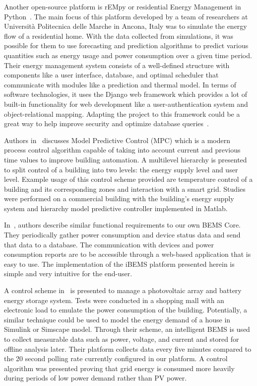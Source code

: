 \documentclass[conference]{IEEEtran}
\begin{document}
Another open-source platform is rEMpy or residential Energy Management in
Python~\cite{FAGIANI2018131}. The main focus of this platform developed by a team of researchers at
Universit\`{a} Politecnica delle Marche in Ancona, Italy was to simulate the
energy flow of a residential home. With the data collected from simulations, it
was possible for them to use forecasting and prediction algorithms to predict
various quantities such as energy usage and power consumption over a given time period. Their energy management system consists of a well-defined structure with components like a user interface, database, and optimal scheduler that communicate with modules like a prediction and thermal model. In terms of software technologies, it uses the Django web framework which provides a lot of built-in functionality for web development like a user-authentication system and object-relational mapping. Adapting the project to this framework could be a great way to help improve security and optimize database queries~\cite{fagiani2017}.

Authors in~\cite{Mayer2017} discusses Model Predictive Control (MPC)
which is a modern process control algorithm capable of taking into account
current and previous time values to improve building
automation. A multilevel hierarchy is presented to split
control of a building into two levels: the energy supply level and user level.
Example usage of this control scheme provided are temperature control of a
building and its corresponding zones and interaction with a smart grid. Studies
were performed on a commercial building with the building's energy supply system
and hierarchy model predictive controller implemented in Matlab.

In~\cite{8246800}, authors describe similar functional requirements to our
own BEMS Core. They periodically gather power consumption and device status data
and send that data to a database. The communication with devices
and power consumption reports are to be accessible through a web-based
application that is easy to use. The implementation of the iBEMS platform presented herein is simple and very
intuitive for the end-user.  

A control scheme in~\cite{Barchi2018} is presented to manage a photovoltaic
array and battery energy storage system. Tests were conducted in a shopping mall
with an electronic load to emulate the power consumption of the building.
Potentially, a similar technique could be used to model the energy demand of a
house in Simulink or Simscape model. Through their scheme, an intelligent BEMS
is used to collect measurable data such as power, voltage, and current and stored for offline analysis later. Their platform collects data every five minutes compared to the 20 second polling rate currently configured in our platform. A control algorithm was presented proving that grid energy is consumed more heavily during periods of low power demand rather than PV power.
\end{document}
